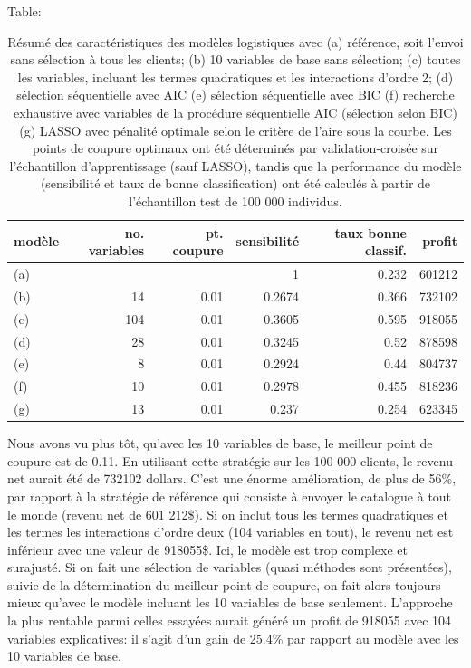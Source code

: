 \documentclass[
  11pt,
  letterpaper,
]{scrbook}
\theoremstyle{definition}
\theoremstyle{remark}
\begin{document}
Table:

\hypertarget{tbl-03-summarylog}{}
\begin{table}
\caption{\label{tbl-03-summarylog}Résumé des caractéristiques des modèles logistiques avec (a) référence,
soit l'envoi sans sélection à tous les clients; (b) 10 variables de base
sans sélection; (c) toutes les variables, incluant les termes
quadratiques et les interactions d'ordre 2; (d) sélection séquentielle
avec AIC (e) sélection séquentielle avec BIC (f) recherche exhaustive
avec variables de la procédure séquentielle AIC (sélection selon BIC)
(g) LASSO avec pénalité optimale selon le critère de l'aire sous la
courbe. Les points de coupure optimaux ont été déterminés par
validation-croisée sur l'échantillon d'apprentissage (sauf LASSO),
tandis que la performance du modèle (sensibilité et taux de bonne
classification) ont été calculés à partir de l'échantillon test de 100
000 individus. }\tabularnewline

\centering
\begin{tabular}{lrrrrr}
\toprule
modèle & no. variables & pt. coupure &  sensibilité & taux bonne classif. & profit\\
\midrule
(a) &  &  & 1 & 0.232 & 601212\\
(b) & 14 & 0.01 & 0.2674 & 0.366 & 732102\\
(c) & 104 & 0.01 & 0.3605 & 0.595 & 918055\\
(d) & 28 & 0.01 & 0.3245 & 0.52 & 878598\\
(e) & 8 & 0.01 & 0.2924 & 0.44 & 804737\\
\addlinespace
(f) & 10 & 0.01 & 0.2978 & 0.455 & 818236\\
(g) & 13 & 0.01 & 0.237 & 0.254 & 623345\\
\bottomrule
\end{tabular}
\end{table}

Nous avons vu plus tôt, qu'avec les 10 variables de base, le meilleur
point de coupure est de 0.11. En utilisant cette stratégie sur les 100
000 clients, le revenu net aurait été de 732102 dollars. C'est une
énorme amélioration, de plus de 56\%, par rapport à la stratégie de
référence qui consiste à envoyer le catalogue à tout le monde (revenu
net de 601 212\$). Si on inclut tous les termes quadratiques et les
termes les interactions d'ordre deux (104 variables en tout), le revenu
net est inférieur avec une valeur de 918055\$. Ici, le modèle est trop
complexe et surajusté. Si on fait une sélection de variables (quasi
méthodes sont présentées), suivie de la détermination du meilleur point
de coupure, on fait alors toujours mieux qu'avec le modèle incluant les
10 variables de base seulement. L'approche la plus rentable parmi celles
essayées aurait généré un profit de 918055 avec 104 variables
explicatives: il s'agit d'un gain de 25.4\% par rapport au modèle avec
les 10 variables de base.
\end{document}
